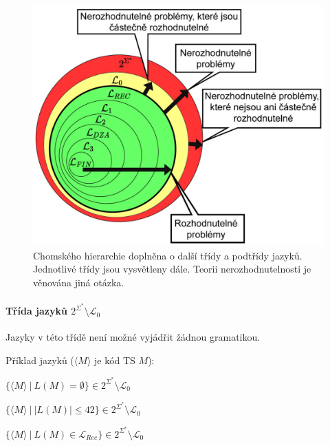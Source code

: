 \begin{figure}[H]
    \centering
    \includegraphics[width=0.9\linewidth]{fj_hierarchy.pdf}
    \caption{Chomského hierarchie doplněna o další třídy a podtřídy jazyků. Jednotlivé třídy jsou vysvětleny dále. Teorii nerozhodnutelnosti je věnována jiná otázka.}
\end{figure}


\paragraph*{Třída jazyků $2^{\Sigma^*} \setminus \mathcal{L}_0$} \begin{compactitem}
    \item Jazyky v této třídě není možné vyjádřit žádnou gramatikou.

    \item Příklad jazyků ($ \langle M \rangle $ je kód TS $M$): \begin{compactitem}
        \item $\{ \langle M \rangle ~|~ L(M) = \emptyset \} \in 2^{\Sigma^*} \setminus \mathcal{L}_0$
        \item $\{ \langle M \rangle ~|~ |L(M)| \leq 42 \} \in 2^{\Sigma^*} \setminus \mathcal{L}_0$
        \item $\{ \langle M \rangle ~|~ L(M) \in \mathcal{L}_{Rec} \} \in 2^{\Sigma^*} \setminus \mathcal{L}_0$
    \end{compactitem}
\end{compactitem}

